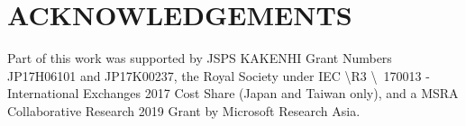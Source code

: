 \documentclass[journal]{IEEEtran}
\begin{document}
\section{ACKNOWLEDGEMENTS}
Part of this work was supported by JSPS KAKENHI Grant Numbers JP17H06101 and JP17K00237, the Royal Society under IEC \textbackslash R3 \textbackslash \ 170013 - International Exchanges 2017 Cost Share (Japan and Taiwan only), and a MSRA Collaborative Research 2019 Grant by Microsoft Research Asia.

\ifCLASSOPTIONcaptionsoff
  \newpage
\fi




\end{document}
